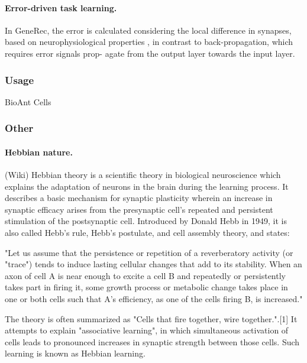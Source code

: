 \paragraph{Error-driven task learning.} In GeneRec, the error is
calculated considering the local difference in synapses,
based on neurophysiological properties \cite{o1998six}, in contrast
to back-propagation, which requires error signals prop-
agate from the output layer towards the input layer.

\subsubsection{Usage} 

BioAnt \cite{schneider2009application} 
Cells \cite{nawrocki2012monitoring} 


\subsubsection{Other} 
\paragraph{Hebbian nature.}

(Wiki) Hebbian theory is a scientific theory in biological neuroscience which explains the adaptation of neurons in the brain during the learning process. It describes a basic mechanism for synaptic plasticity wherein an increase in synaptic efficacy arises from the presynaptic cell's repeated and persistent stimulation of the postsynaptic cell. Introduced by Donald Hebb in 1949, it is also called Hebb's rule, Hebb's postulate, and cell assembly theory, and states:

    "Let us assume that the persistence or repetition of a reverberatory activity (or "trace") tends to induce lasting cellular changes that add to its stability. When an axon of cell A is near enough to excite a cell B and repeatedly or persistently takes part in firing it, some growth process or metabolic change takes place in one or both cells such that A's efficiency, as one of the cells firing B, is increased."

The theory is often summarized as "Cells that fire together, wire together.".[1] It attempts to explain "associative learning", in which simultaneous activation of cells leads to pronounced increases in synaptic strength between those cells. Such learning is known as Hebbian learning.

